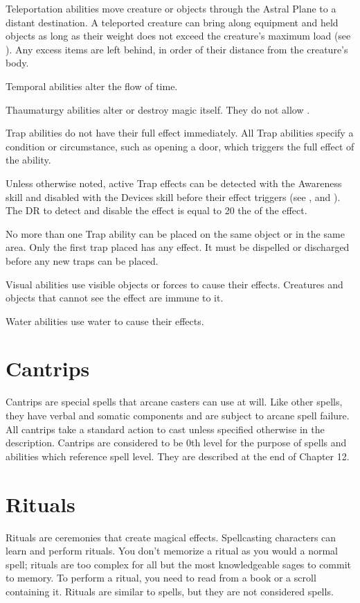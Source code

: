      Teleportation abilities move creature or objects through the Astral Plane to a distant destination.
    A teleported creature can bring along equipment and held objects as long as their weight does not exceed the creature's maximum load (see ). Any excess items are left behind, in order of their distance from the creature's body.

     Temporal abilities alter the flow of time.

     Thaumaturgy abilities alter or destroy magic itself.
    They do not allow .

     Trap abilities do not have their full effect immediately.
    All Trap abilities specify a condition or circumstance, such as opening a door, which triggers the full effect of the ability.
    \par Unless otherwise noted, active Trap effects can be detected with the Awareness skill and disabled with the Devices skill before their effect triggers (see , and ).
    The DR to detect and disable the effect is equal to 20 \add the  of the effect.
    \par No more than one Trap ability can be placed on the same object or in the same area.
    Only the first trap placed has any effect.
    It must be dispelled or discharged before any new traps can be placed.

     Visual abilities use visible objects or forces to cause their effects.
    Creatures and objects that cannot see the effect are immune to it.

     Water abilities use water to cause their effects.

\section{Cantrips}\label{Cantrips}
    Cantrips are special spells that arcane casters can use at will.
    Like other spells, they have verbal and somatic components and are subject to arcane spell failure.
    All cantrips take a standard action to cast unless specified otherwise in the description.
    Cantrips are considered to be 0th level for the purpose of spells and abilities which reference spell level.
    They are described at the end of Chapter 12.

\section{Rituals}\label{Rituals}
    Rituals are ceremonies that create magical effects.
    Spellcasting characters can learn and perform rituals.
    You don't memorize a ritual as you would a normal spell; rituals are too complex for all but the most knowledgeable sages to commit to memory.
    To perform a ritual, you need to read from a book or a scroll containing it.
    Rituals are similar to spells, but they are not considered spells.
